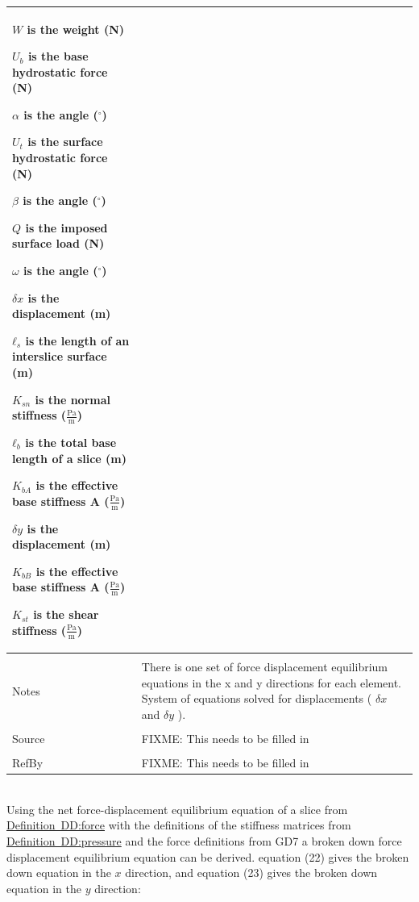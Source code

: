\documentclass[12pt]{article}
\begin{document}
\begin{minipage}{\textwidth}
\begin{tabular}{p{} p{}}
\begin{symbDescription}
              \item{$W$ is the weight (N)}
              \item{${U_{b}}$ is the base hydrostatic force (N)}
              \item{$α$ is the angle (${}^{\circ}$)}
              \item{${U_{t}}$ is the surface hydrostatic force (N)}
              \item{$β$ is the angle (${}^{\circ}$)}
              \item{$Q$ is the imposed surface load (N)}
              \item{$ω$ is the angle (${}^{\circ}$)}
              \item{$δx$ is the displacement (m)}
              \item{${ℓ_{s}}$ is the length of an interslice surface (m)}
              \item{${K_{sn}}$ is the normal stiffness ($\frac{\text{Pa}}{\text{m}}$)}
              \item{${ℓ_{b}}$ is the total base length of a slice (m)}
              \item{${K_{bA}}$ is the effective base stiffness A ($\frac{\text{Pa}}{\text{m}}$)}
              \item{$δy$ is the displacement (m)}
              \item{${K_{bB}}$ is the effective base stiffness A ($\frac{\text{Pa}}{\text{m}}$)}
              \item{${K_{st}}$ is the shear stiffness ($\frac{\text{Pa}}{\text{m}}$)}
              \end{symbDescription}
\\ \midrule \\
Notes & There is one set of force displacement equilibrium equations in the x and y directions for each element. System of equations solved for displacements ( $δx$ and $δy$ ).
\\ \midrule \\
Source & FIXME: This needs to be filled in
\\ \midrule \\
RefBy & FIXME: This needs to be filled in
\\ \bottomrule \end{tabular}
\end{minipage}\\
Using the net force-displacement equilibrium equation of a slice from \hyperref[DD:force]{Definition~DD:force} with the definitions of the stiffness matrices from \hyperref[DD:pressure]{Definition~DD:pressure} and the force definitions from GD7 a broken down force displacement equilibrium equation can be derived. equation (22) gives the broken down equation in the $x$ direction, and equation (23) gives the broken down equation in the $y$ direction:
\end{document}
